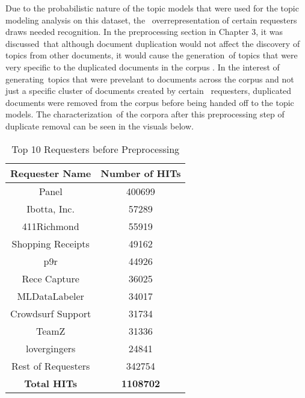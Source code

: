 \documentclass[letterpaper,12pt]{article}
\begin{document}
Due to the probabilistic nature of the topic models that were used for the topic modeling analysis on this dataset, the \
overrepresentation of certain requesters draws needed recognition. In the preprocessing section in Chapter 3, it was discussed\
that although document duplication would not affect the discovery of topics from other documents, it would cause the generation\
of topics that were very specific to the duplicated documents in the corpus \cite{schofieldunderstanding}. In the interest of generating\
topics that were prevelant to documents across the corpus and not just a specific cluster of documents created by certain \
requesters, duplicated documents were removed from the corpus before being handed off to the topic models. The characterization\
of the corpora after this preprocessing step of duplicate removal can be seen in the visuals below.

\begin{table}
	\caption{\label{tab:requester_top_10} Top 10 Requesters before Preprocessing}
	\begin{center}
		\begin{tabular}{| c | c |}
			\hline
			\textbf{Requester Name} & \textbf{Number of HITs} \\
			\hline
			Panel              &          400699 \\
			\hline
			Ibotta, Inc.       &           57289 \\
			\hline
			411Richmond        &           55919 \\
			\hline
			Shopping Receipts  &           49162 \\
			\hline
			p9r                &           44926 \\
			\hline
			Rece Capture       &           36025 \\
			\hline
			MLDataLabeler      &           34017 \\
			\hline
			Crowdsurf Support  &           31734 \\
			\hline
			TeamZ              &           31336 \\
			\hline
			lovergingers       &           24841 \\
			\hline
			Rest of Requesters &          342754 \\
			\hline
			\textbf{Total HITs} & \textbf{1108702} \\
			\hline
			\end{tabular}
	\end{center}
\end{table}
\end{document}
